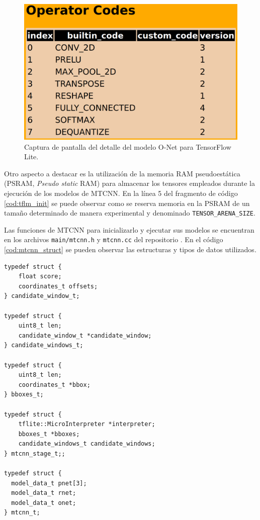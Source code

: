 \begin{figure}[h]
	\centering
	\includegraphics[scale=0.12]{./Figures/fw_tflite_ops.png}
	\caption{Captura de pantalla del detalle del modelo O-Net para TensorFlow Lite.}
	\label{fig:fw_tflite_ops}
\end{figure}

Otro aspecto a destacar es la utilización de la memoria RAM pseudoestática (PSRAM, \textit{Pseudo static} RAM) para almacenar los tensores empleados durante la ejecución de los modelos de MTCNN. En la línea 5 del fragmento de código \ref{cod:tflm_init} se puede observar como se reserva memoria en la PSRAM de un tamaño determinado de manera experimental y denominado \texttt{TENSOR\_ARENA\_SIZE}.

Las funciones de MTCNN para inicializarlo y ejecutar sus modelos se encuentran en los archivos \texttt{main/mtcnn.h} y \texttt{mtcnn.cc} del repositorio \cite{mtcnn_repo}. En el código \ref{cod:mtcnn_struct} se pueden observar las estructuras y tipos de datos utilizados.

\begin{lstlisting}[label=cod:mtcnn_struct,caption=Estructuras y tipos de datos de MTCNN.]
typedef struct {
    float score;
    coordinates_t offsets;
} candidate_window_t;

typedef struct {
    uint8_t len;
    candidate_window_t *candidate_window;
} candidate_windows_t;

typedef struct {
    uint8_t len;
    coordinates_t *bbox;
} bboxes_t;

typedef struct {
	tflite::MicroInterpreter *interpreter;
	bboxes_t *bboxes;
	candidate_windows_t candidate_windows;
} mtcnn_stage_t;;

typedef struct {
  model_data_t pnet[3];
  model_data_t rnet;
  model_data_t onet;
} mtcnn_t;
\end{lstlisting}

